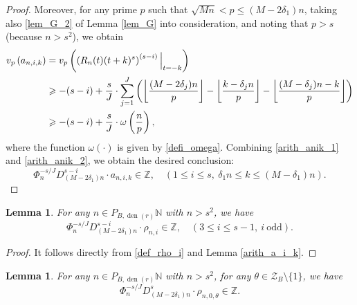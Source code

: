 \documentclass[12pt]{article}
\newtheorem{lemma}[theorem]{Lemma}
\numberwithin{equation}{section}
\begin{document}
\begin{proof}
Moreover, for any prime $p$ such that $\sqrt{Mn} < p \leqslant (M-2\delta_1)n$, taking also \eqref{lem_G_2} of Lemma \ref{lem_G} into consideration, and noting that $p > s$ (because $n > s^2$), we obtain
\begin{align}
v_p\left( a_{n,i,k} \right) &=  v_p\left( \left( R_n(t)(t+k)^{s} \right)^{(s-i)} \Big|_{t=-k} \right) \notag\\
	&\geqslant -(s-i) + \frac{s}{J}\cdot\sum_{j=1}^{J} \left( \left\lfloor \frac{(M-2\delta_j)n}{p}  \right\rfloor - \left\lfloor \frac{k-\delta_jn}{p}  \right\rfloor - \left\lfloor \frac{(M-\delta_j)n - k}{p}  \right\rfloor \right)  \notag\\
	&\geqslant -(s-i) + \frac{s}{J}\cdot\omega\left( \frac{n}{p} \right), \label{arith_anik_2}
\end{align}
where the function $\omega(\cdot)$ is given by \eqref{defi_omega}. Combining \eqref{arith_anik_1} and \eqref{arith_anik_2}, we obtain the desired conclusion:
\[ \Phi_n^{-s/J} D_{(M-2\delta_1)n}^{s-i} \cdot  a_{n,i,k} \in \mathbb{Z}, \quad (1 \leqslant i \leqslant s,~\delta_1n \leqslant k \leqslant (M-\delta_1)n).   \]
\end{proof}


\begin{lemma}\label{arith_rho_i}
For any $n \in P_{B,\operatorname{den}(r)}\mathbb{N}$ with $n > s^2$, we have 
\[ \Phi_n^{-s/J} D_{(M-2\delta_1)n}^{s-i} \cdot  \rho_{n,i} \in \mathbb{Z}, \quad (3 \leqslant i \leqslant s-1,~i~\text{odd}).  \]
\end{lemma}

\begin{proof}
It follows directly from \eqref{def_rho_i} and Lemma \ref{arith_a_i_k}.
\end{proof}


\begin{lemma}\label{arith_rho_0_theta}
For any $n \in P_{B,\operatorname{den}(r)}\mathbb{N}$ with $n > s^2$, for any $\theta \in \mathcal{Z}_B \setminus \{ 1 \}$, we have 
\[  \Phi_n^{-s/J} D_{(M-2\delta_1)n}^{s} \cdot  \rho_{n,0,\theta} \in \mathbb{Z}.  \]


\end{lemma}
\end{document}
